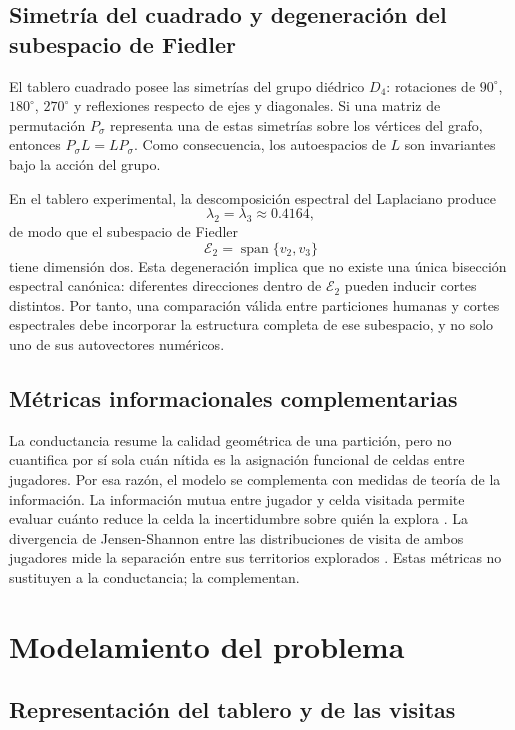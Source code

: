 \documentclass[journal]{IEEEtran}
\newcommand{\Etwo}{\mathcal{E}_2}
\begin{document}
\subsection{Simetría del cuadrado y degeneración del subespacio de Fiedler}

El tablero cuadrado posee las simetrías del grupo diédrico $D_4$: rotaciones de $90^\circ$, $180^\circ$, $270^\circ$ y reflexiones respecto de ejes y diagonales. Si una matriz de permutación $P_\sigma$ representa una de estas simetrías sobre los vértices del grafo, entonces $P_\sigma L = L P_\sigma$. Como consecuencia, los autoespacios de $L$ son invariantes bajo la acción del grupo.

En el tablero experimental, la descomposición espectral del Laplaciano produce
\[
\lambda_2=\lambda_3 \approx 0.4164,
\]
de modo que el subespacio de Fiedler
\[
\Etwo = \operatorname{span}\{v_2,v_3\}
\]
tiene dimensión dos. Esta degeneración implica que no existe una única bisección espectral canónica: diferentes direcciones dentro de $\Etwo$ pueden inducir cortes distintos. Por tanto, una comparación válida entre particiones humanas y cortes espectrales debe incorporar la estructura completa de ese subespacio, y no solo uno de sus autovectores numéricos.

\subsection{Métricas informacionales complementarias}

La conductancia resume la calidad geométrica de una partición, pero no cuantifica por sí sola cuán nítida es la asignación funcional de celdas entre jugadores. Por esa razón, el modelo se complementa con medidas de teoría de la información. La información mutua entre jugador y celda visitada permite evaluar cuánto reduce la celda la incertidumbre sobre quién la explora \cite{cover2006}. La divergencia de Jensen-Shannon entre las distribuciones de visita de ambos jugadores mide la separación entre sus territorios explorados \cite{lin1991}. Estas métricas no sustituyen a la conductancia; la complementan.

\section{Modelamiento del problema}

\subsection{Representación del tablero y de las visitas}
\end{document}
